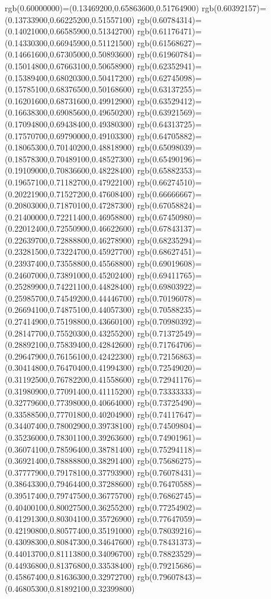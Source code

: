 {{rgb(0.60000000)=(0.13469200,0.65863600,0.51764900)
rgb(0.60392157)=(0.13733900,0.66225200,0.51557100)
rgb(0.60784314)=(0.14021000,0.66585900,0.51342700)
rgb(0.61176471)=(0.14330300,0.66945900,0.51121500)
rgb(0.61568627)=(0.14661600,0.67305000,0.50893600)
rgb(0.61960784)=(0.15014800,0.67663100,0.50658900)
rgb(0.62352941)=(0.15389400,0.68020300,0.50417200)
rgb(0.62745098)=(0.15785100,0.68376500,0.50168600)
rgb(0.63137255)=(0.16201600,0.68731600,0.49912900)
rgb(0.63529412)=(0.16638300,0.69085600,0.49650200)
rgb(0.63921569)=(0.17094800,0.69438400,0.49380300)
rgb(0.64313725)=(0.17570700,0.69790000,0.49103300)
rgb(0.64705882)=(0.18065300,0.70140200,0.48818900)
rgb(0.65098039)=(0.18578300,0.70489100,0.48527300)
rgb(0.65490196)=(0.19109000,0.70836600,0.48228400)
rgb(0.65882353)=(0.19657100,0.71182700,0.47922100)
rgb(0.66274510)=(0.20221900,0.71527200,0.47608400)
rgb(0.66666667)=(0.20803000,0.71870100,0.47287300)
rgb(0.67058824)=(0.21400000,0.72211400,0.46958800)
rgb(0.67450980)=(0.22012400,0.72550900,0.46622600)
rgb(0.67843137)=(0.22639700,0.72888800,0.46278900)
rgb(0.68235294)=(0.23281500,0.73224700,0.45927700)
rgb(0.68627451)=(0.23937400,0.73558800,0.45568800)
rgb(0.69019608)=(0.24607000,0.73891000,0.45202400)
rgb(0.69411765)=(0.25289900,0.74221100,0.44828400)
rgb(0.69803922)=(0.25985700,0.74549200,0.44446700)
rgb(0.70196078)=(0.26694100,0.74875100,0.44057300)
rgb(0.70588235)=(0.27414900,0.75198800,0.43660100)
rgb(0.70980392)=(0.28147700,0.75520300,0.43255200)
rgb(0.71372549)=(0.28892100,0.75839400,0.42842600)
rgb(0.71764706)=(0.29647900,0.76156100,0.42422300)
rgb(0.72156863)=(0.30414800,0.76470400,0.41994300)
rgb(0.72549020)=(0.31192500,0.76782200,0.41558600)
rgb(0.72941176)=(0.31980900,0.77091400,0.41115200)
rgb(0.73333333)=(0.32779600,0.77398000,0.40664000)
rgb(0.73725490)=(0.33588500,0.77701800,0.40204900)
rgb(0.74117647)=(0.34407400,0.78002900,0.39738100)
rgb(0.74509804)=(0.35236000,0.78301100,0.39263600)
rgb(0.74901961)=(0.36074100,0.78596400,0.38781400)
rgb(0.75294118)=(0.36921400,0.78888800,0.38291400)
rgb(0.75686275)=(0.37777900,0.79178100,0.37793900)
rgb(0.76078431)=(0.38643300,0.79464400,0.37288600)
rgb(0.76470588)=(0.39517400,0.79747500,0.36775700)
rgb(0.76862745)=(0.40400100,0.80027500,0.36255200)
rgb(0.77254902)=(0.41291300,0.80304100,0.35726900)
rgb(0.77647059)=(0.42190800,0.80577400,0.35191000)
rgb(0.78039216)=(0.43098300,0.80847300,0.34647600)
rgb(0.78431373)=(0.44013700,0.81113800,0.34096700)
rgb(0.78823529)=(0.44936800,0.81376800,0.33538400)
rgb(0.79215686)=(0.45867400,0.81636300,0.32972700)
rgb(0.79607843)=(0.46805300,0.81892100,0.32399800)
}}
